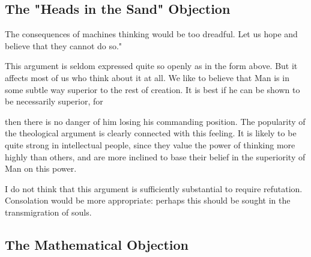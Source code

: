 \documentclass{article}
\begin{document}
\subsection{The "Heads in the Sand" Objection}

The consequences of machines thinking would be too dreadful. Let us hope and believe that they cannot do so."

This argument is seldom expressed quite so openly as in the form above. But it affects most of us who think about it at all. We like to believe that Man is in some subtle way superior to the rest of creation. It is best if he can be shown to be necessarily superior, for

then there is no danger of him losing his commanding position. The popularity of the theological argument is clearly connected with this feeling. It is likely to be quite strong in intellectual people, since they value the power of thinking more highly than others, and are more inclined to base their belief in the superiority of Man on this power.

I do not think that this argument is sufficiently substantial to require refutation. Consolation would be more appropriate: perhaps this should be sought in the transmigration of souls.


\subsection{The Mathematical Objection}
\end{document}
